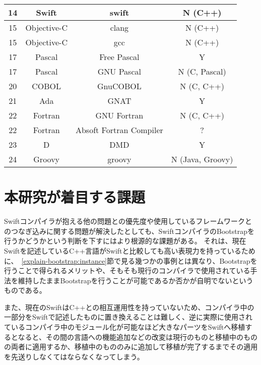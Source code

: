 \begin{table}[hb]
\begin{center}
\begin{tabular}{|c|c|c|c|}
            \hline
            14 & Swift & swift & N (C++) \\
            \hline
            15 & Objective-C & clang & N (C++) \\
            \hline
            15 & Objective-C & gcc & N (C++) \\
            \hline
            17 & Pascal & Free Pascal & Y \\
            \hline
            17 & Pascal & GNU Pascal & N (C, Pascal) \\
            \hline
            20 & COBOL & GnuCOBOL & N (C, C++) \\
            \hline
            21 & Ada & GNAT & Y \\
            \hline
            22 & Fortran & GNU Fortran & N (C, C++) \\
            \hline
            22 & Fortran & Absoft Fortran Compiler & ? \\
            \hline
            23 & D & DMD & Y \\
            \hline
            24 & Groovy & groovy & N (Java, Groovy) \\
            \hline
        \end{tabular}
        \label{table:bootstrapping-languages}
    \end{center}
\end{table}


\section{本研究が着目する課題}
\label{introduction:issue}

Swiftコンパイラが抱える他の問題との優先度や使用しているフレームワークとのつなぎ込みに関する問題が解決したとしても、SwiftコンパイラのBootstrapを行うかどうかという判断を下すにはより根源的な課題がある。
それは、現在Swiftを記述しているC++言語がSwiftと比較しても高い表現力を持っているために、~\ref{explain-bootstrap:instance}節で見る幾つかの事例とは異なり、Bootstrapを行うことで得られるメリットや、そもそも現行のコンパイラで使用されている手法を維持したままBootstrapを行うことが可能であるか否かが自明でないというものである。

また、現在のSwiftはC++との相互運用性を持っていないため、コンパイラ中の一部分をSwiftで記述したものに置き換えることは難しく、逆に実際に使用されているコンパイラ中のモジュール化が可能なほど大きなパーツをSwiftへ移植するとなると、その間の言語への機能追加などの改変は現行のものと移植中のものの両者に適用するか、移植中のもののみに追加して移植が完了するまでその適用を先送りしなくてはならなくなってしまう。


